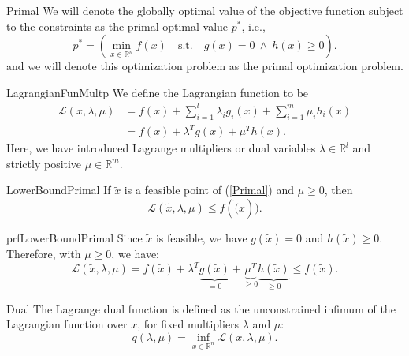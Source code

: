 \begin{theo}{Primal}
    We will denote the globally optimal value of the objective function subject to the constraints as the primal optimal value $p^*$, i\@.e\@., 
    \begin{equation*}
        p^* = \left( \min_{x \in \mathbb{R}^n} f(x) \quad \text{s.t.} \quad g(x) = 0 \ \land \ h(x) \geq 0 \right).
    \end{equation*}
    and we will denote this optimization problem as the primal optimization problem.
\end{theo}

\begin{theo}{LagrangianFunMultp}
    We define the Lagrangian function to be 
    \begin{align*}
        \mathcal{L}(x, \lambda, \mu) 
            &= f(x) + \sum_{i=1}^l \lambda_i g_i(x) + \sum_{i=1}^m \mu_i h_i(x) \\
            &= f(x) + \lambda^T g(x) + \mu^T h(x).
    \end{align*}
    Here, we have introduced Lagrange multipliers or dual variables $\lambda \in \mathbb{R}^l$ and strictly positive $\mu \in \mathbb{R}^m$. 
\end{theo}

\begin{lem}{LowerBoundPrimal}
    If $\tilde{x}$ is a feasible point of (\ref{Primal}) and $\mu \geq 0$, then
    \begin{equation*}
        \mathcal{L}(\tilde{x}, \lambda, \mu) \leq f(\tilde(x)).
    \end{equation*}
    \vspace*{-0.5cm}
\end{lem}

\begin{prf}{prfLowerBoundPrimal}
    Since $\tilde{x}$ is feasible, we have $g(\tilde{x}) = 0$ and $h(\tilde{x}) \geq 0$. Therefore, with $\mu \geq 0$, we have:
    \begin{equation*}
        \mathcal{L}(\tilde{x}, \lambda, \mu) = f(\tilde{x}) + \lambda^T \underbrace{g(\tilde{x})}_{=0} + \underbrace{\mu^T}_{\geq 0} \underbrace{h(\tilde{x})}_{\geq 0} \leq f(\tilde{x}).
    \end{equation*}
    \vspace*{-0.5cm}
\end{prf}

\begin{theo}{Dual}
    The Lagrange dual function is defined as the unconstrained infimum of the Lagrangian function over $x$, for fixed multipliers $\lambda$ and $\mu$:
    \begin{equation*}
        q(\lambda, \mu) = \inf_{x \in \mathbb{R}^n} \mathcal{L}(x, \lambda, \mu).
    \end{equation*}
    \vspace*{-0.5cm}
\end{theo}

